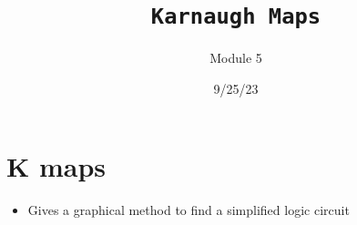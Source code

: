 \documentclass[a4paper,12pt]{article}
\title{\texttt{Karnaugh Maps}\\\hrulefill}
\author{Module 5}
\date{\small{9/25/23}}
\begin{document}
    \maketitle

    \section{K maps}
      \begin{itemize}
        \item Gives a graphical method to  find a simplified logic circuit
      \end{itemize}
\end{document}
